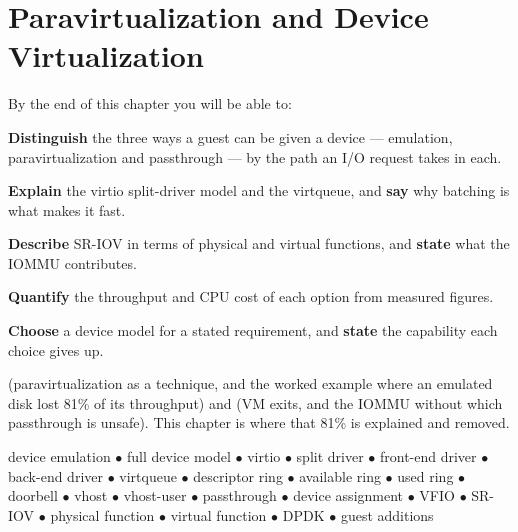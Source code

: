 \chapter{Paravirtualization and Device Virtualization}\label{ch:paravirt}

\begin{outcomes}
By the end of this chapter you will be able to:
\begin{tight}
  \item \textbf{Distinguish} the three ways a guest can be given a device ---
        emulation, paravirtualization and passthrough --- by the path an I/O
        request takes in each.
  \item \textbf{Explain} the virtio split-driver model and the virtqueue, and
        \textbf{say} why batching is what makes it fast.
  \item \textbf{Describe} SR-IOV in terms of physical and virtual functions,
        and \textbf{state} what the IOMMU contributes.
  \item \textbf{Quantify} the throughput and CPU cost of each option from
        measured figures.
  \item \textbf{Choose} a device model for a stated requirement, and
        \textbf{state} the capability each choice gives up.
\end{tight}
\end{outcomes}

\begin{prereq}
 (paravirtualization as a technique, and the worked
example where an emulated disk lost 81\% of its throughput) and
 (VM exits, and the IOMMU without which passthrough is
unsafe). This chapter is where that 81\% is explained and removed.
\end{prereq}

\begin{keyterms}
device emulation $\bullet$ full device model $\bullet$ virtio $\bullet$ split
driver $\bullet$ front-end driver $\bullet$ back-end driver $\bullet$ virtqueue
$\bullet$ descriptor ring $\bullet$ available ring $\bullet$ used ring $\bullet$
doorbell $\bullet$ vhost $\bullet$ vhost-user $\bullet$ passthrough $\bullet$
device assignment $\bullet$ VFIO $\bullet$ SR-IOV $\bullet$ physical function
$\bullet$ virtual function $\bullet$ DPDK $\bullet$ guest additions
\end{keyterms}

